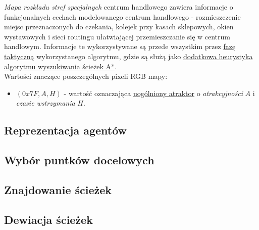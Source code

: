 \documentclass[a4paper, 12pt]{article}
\begin{document}
        \emph{Mapa rozkładu stref specjalnych} centrum handlowego zawiera informacje o funkcjonalnych cechach modelowanego centrum handlowego - rozmieszczenie miejsc przeznaczonych do czekania, kolejek przy kasach sklepowych, okien wystawowych i sieci routingu ułatwiającej przemieszczanie się w centrum handlowym. Informacje te wykorzystywane są przede wszystkim przez \hyperref[sec:tactical]{fazę taktyczną} wykorzystanego algorytmu, gdzie są służą jako \hyperref[sec:path-deviation]{dodatkowa heurystyka} \hyperref[sec:path-finding]{algorytmu wyszukiwania ścieżek A*}. \\

\noindent
Wartości znaczące poszczególnych pixeli RGB mapy:

        \begin{itemize}
            \item $(0x7F, A, H)$ - wartość oznaczająca \hyperref[sec:path-deviation]{uogólniony atraktor} o \emph{atrakcyjności} $A$ i \emph{czasie wstrzymania} $H$.
        \end{itemize}

        \subsection{Reprezentacja agentów}
        \label{sec:actor-impl}


        \subsection{Wybór puntków docelowych}
        \label{sec:destination-choice}


        \subsection{Znajdowanie ścieżek}
        \label{sec:path-finding}


        \subsection{Dewiacja ścieżek}
        \label{sec:path-deviation}

\end{document}
